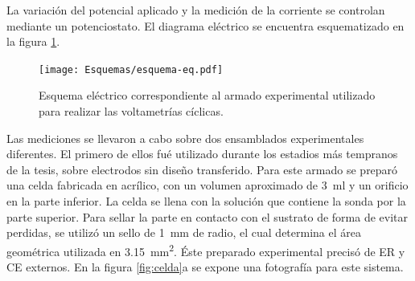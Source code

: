 			La variación del potencial aplicado y la medición de la corriente se controlan mediante un potenciostato. El diagrama eléctrico se encuentra esquematizado en la figura \ref{fig:eq-circuito}.

				\begin{figure}[h!]
			 		  \begin{center}
			 		  \texttt{[image: Esquemas/esquema-eq.pdf]}
			 		  \caption[Circuito eléctrico EQ]{Esquema eléctrico correspondiente al armado experimental utilizado para realizar las voltametrías cíclicas.}
			 		  \label{fig:eq-circuito}
			 		  \end{center}
			 		  \end{figure}

			Las mediciones se llevaron a cabo sobre dos ensamblados experimentales diferentes. El primero de ellos fué utilizado durante los estadios más tempranos de la tesis, sobre electrodos sin diseño transferido. Para este armado se preparó una celda fabricada en acrílico, con un volumen aproximado de \SI{3}{\ml} y un orificio en la parte inferior. La celda se llena con la solución que contiene la sonda por la parte superior. Para sellar la parte en contacto con el sustrato de forma de evitar perdidas, se utilizó un sello de \SI{1}{\mm} de radio, el cual determina el área geométrica utilizada en \SI{3.15}{\mm^{2}}. Éste preparado experimental precisó de ER y CE externos. En la figura \ref{fig:celda}a se expone una fotografía para este sistema. 

